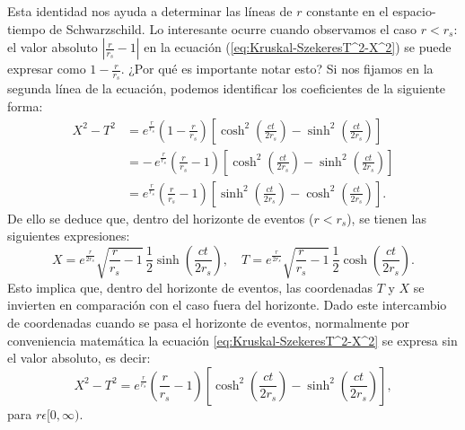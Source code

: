 \noindent
Esta identidad nos ayuda a determinar las líneas de \(r\) constante en el espacio-tiempo de Schwarzschild. Lo interesante ocurre cuando observamos el caso \(r < r_s\): el valor absoluto \(\left|\frac{r}{r_s}-1\right|\) en la ecuación (\ref{eq:Kruskal-SzekeresT^2-X^2}) se puede expresar como \(1-\frac{r}{r_s}\). ¿Por qué es importante notar esto? Si nos fijamos en la segunda línea de la ecuación, podemos identificar los coeficientes de la siguiente forma:
\begin{equation}
    \begin{aligned}
       X^2 -  T^2  &= e^{\frac{r}{r_s}} \left(1-\frac{r}{r_s}\right) \left[ \cosh^2\left(\frac{ct}{2r_s}\right) - \sinh^2\left(\frac{ct}{2r_s}\right) \right] \\
        &= -\, e^{\frac{r}{r_s}} \left(\frac{r}{r_s}-1\right) \left[ \cosh^2\left(\frac{ct}{2r_s}\right) - \sinh^2\left(\frac{ct}{2r_s}\right) \right] \\
        &= e^{\frac{r}{r_s}} \left(\frac{r}{r_s}-1\right) \left[ \sinh^2\left(\frac{ct}{2r_s}\right) - \cosh^2\left(\frac{ct}{2r_s}\right) \right].
    \end{aligned}
\end{equation}
De ello se deduce que, dentro del horizonte de eventos (\(r < r_s\)), se tienen las siguientes expresiones:
\begin{equation}
    X = e^{\frac{r}{2r_s}} \sqrt{\frac{r}{r_s}-1} \, \frac{1}{2} \sinh\left(\frac{ct}{2r_s}\right), \quad 
    T = e^{\frac{r}{2r_s}} \sqrt{\frac{r}{r_s}-1} \, \frac{1}{2} \cosh\left(\frac{ct}{2r_s}\right).
\end{equation}
Esto implica que, dentro del horizonte de eventos, las coordenadas \(T\) y \(X\) se invierten en comparación con el caso fuera del horizonte. Dado este intercambio de coordenadas cuando se pasa el horizonte de eventos, normalmente por conveniencia matemática la ecuación \ref{eq:Kruskal-SzekeresT^2-X^2} se expresa sin el valor absoluto, es decir:
\begin{equation}
    X^2 - T^2 = e^{\frac{r}{r_s}} \left(\frac{r}{r_s}-1\right) \left[ \cosh^2\left(\frac{ct}{2r_s}\right) - \sinh^2\left(\frac{ct}{2r_s}\right) \right],
\end{equation} 
para $r \epsilon [0,\infty ) $.

